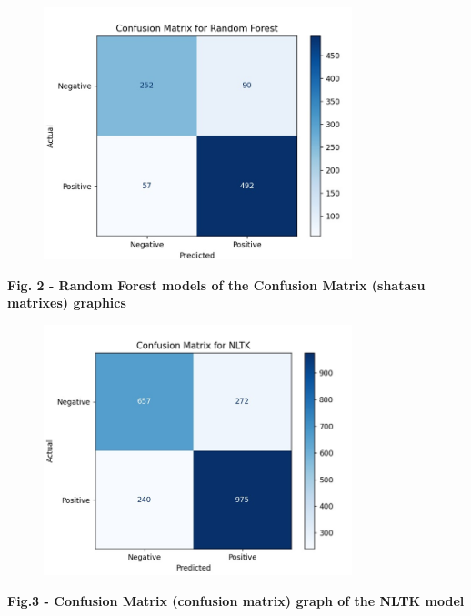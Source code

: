 \begin{figure}[H]
	\centering
	\includegraphics[width=0.8\textwidth]{media/ict/image23}
	\caption*{}
\end{figure}


{\bfseries Fig. 2 - Random Forest models of the Confusion Matrix (shatasu
matrixes) graphics}

\begin{figure}[H]
	\centering
	\includegraphics[width=0.8\textwidth]{media/ict/image24}
	\caption*{}
\end{figure}


{\bfseries Fig.3 - Confusion Matrix (confusion matrix) graph of the NLTK
model}

